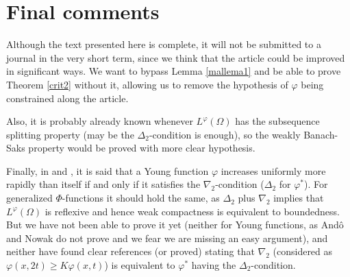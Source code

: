 \documentclass[11pt,a4paper]{amsart}
\newcommand{\lphi}{{L^{\varphi}(\Omega)}}
\begin{document}
\section{Final comments}

Although the text presented here is complete, it will not be submitted to a journal in the very short term, since we think that the article could be improved in significant ways. We want to bypass Lemma \ref{mallema1} and be able to prove Theorem \ref{crit2} without it, allowing us to remove the hypothesis of $\varphi$ being constrained along the article. %

Also, it is probably already known whenever $\lphi$ has the subsequence splitting property (may be the $\Delta_2$-condition is enough), so the weakly Banach-Saks property would be proved with more clear hypothesis.

Finally, in \cite{Ando} and \cite{Nowak}, it is said that a Young function $\varphi$ increases uniformly more rapidly than itself if and only if it satisfies the $\nabla_2$-condition ($\Delta_2$ for $\varphi^*$). For generalized $\Phi$-functions it should hold the same, as $\Delta_2$ plus $\nabla_2$ implies that $\lphi$ is reflexive and hence weak compactness is equivalent to boundedness. But we have not been able to prove it yet (neither for Young functions, as And\^o and Nowak do not prove and we fear we are missing an easy argument), and neither have found clear references (or proved) stating that $\nabla_2$ (considered as $\varphi(x,2t)\geq K\varphi(x,t)$) is equivalent to $\varphi^*$ having the $\Delta_2$-condition.
\end{document}
